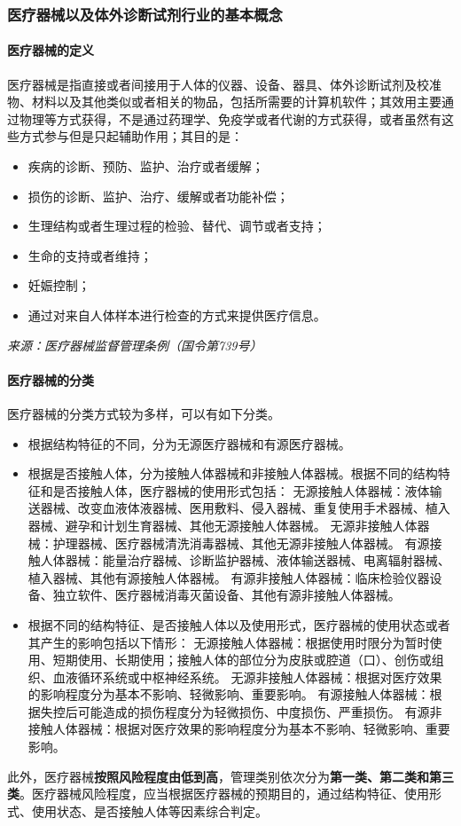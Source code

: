 \subsubsection{医疗器械以及体外诊断试剂行业的基本概念}

\paragraph{医疗器械的定义}
医疗器械是指直接或者间接用于人体的仪器、设备、器具、体外诊断试剂及校准物、材料以及其他类似或者相关的物品，包括所需要的计算机软件；其效用主要通过物理等方式获得，不是通过药理学、免疫学或者代谢的方式获得，或者虽然有这些方式参与但是只起辅助作用；其目的是：
\begin{itemize}
    \item 疾病的诊断、预防、监护、治疗或者缓解；
    \item 损伤的诊断、监护、治疗、缓解或者功能补偿；
    \item 生理结构或者生理过程的检验、替代、调节或者支持；
    \item 生命的支持或者维持；
    \item 妊娠控制；
    \item 通过对来自人体样本进行检查的方式来提供医疗信息。
\end{itemize}
\textit{来源：医疗器械监督管理条例（国令第739号）}

\paragraph{医疗器械的分类}
医疗器械的分类方式较为多样，可以有如下分类。
\begin{itemize}
    \item 根据结构特征的不同，分为无源医疗器械和有源医疗器械。
    \item 根据是否接触人体，分为接触人体器械和非接触人体器械。根据不同的结构特征和是否接触人体，医疗器械的使用形式包括：
        \subitem 无源接触人体器械：液体输送器械、改变血液体液器械、医用敷料、侵入器械、重复使用手术器械、植入器械、避孕和计划生育器械、其他无源接触人体器械。
        \subitem 无源非接触人体器械：护理器械、医疗器械清洗消毒器械、其他无源非接触人体器械。
        \subitem 有源接触人体器械：能量治疗器械、诊断监护器械、液体输送器械、电离辐射器械、植入器械、其他有源接触人体器械。
        \subitem 有源非接触人体器械：临床检验仪器设备、独立软件、医疗器械消毒灭菌设备、其他有源非接触人体器械。
    \item 根据不同的结构特征、是否接触人体以及使用形式，医疗器械的使用状态或者其产生的影响包括以下情形：
        \subitem 无源接触人体器械：根据使用时限分为暂时使用、短期使用、长期使用；接触人体的部位分为皮肤或腔道（口）、创伤或组织、血液循环系统或中枢神经系统。
        \subitem 无源非接触人体器械：根据对医疗效果的影响程度分为基本不影响、轻微影响、重要影响。
        \subitem 有源接触人体器械：根据失控后可能造成的损伤程度分为轻微损伤、中度损伤、严重损伤。
        \subitem 有源非接触人体器械：根据对医疗效果的影响程度分为基本不影响、轻微影响、重要影响。
\end{itemize}
此外，医疗器械\textbf{按照风险程度由低到高}，管理类别依次分为\textbf{第一类、第二类和第三类}。医疗器械风险程度，应当根据医疗器械的预期目的，通过结构特征、使用形式、使用状态、是否接触人体等因素综合判定。

